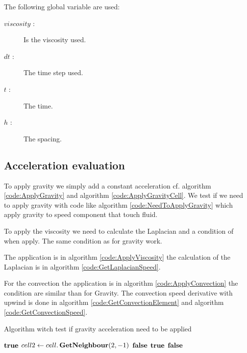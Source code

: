 The following global variable are used:
\begin{description}
 \item[$viscosity$ :] Is the viscosity used.
 \item[$dt$ :] The time step used.
 \item[$t$ :] The time.
 \item[$h$ :] The spacing.
\end{description}


\subsection{Acceleration evaluation}

To apply gravity we simply add a constant acceleration cf. algorithm \ref{code:ApplyGravity} and algorithm \ref{code:ApplyGravityCell}.
We test if we need to apply gravity with code like algorithm \ref{code:NeedToApplyGravity} which apply gravity to speed component
that touch fluid.

To apply the viscosity we need to calculate the Laplacian and a condition of when apply.
The same condition as for gravity work.

The application is in algorithm \ref{code:ApplyViscosity} the calculation of the Laplacian is in algorithm \ref{code:GetLaplacianSpeed}.

For the convection the application is in algorithm \ref{code:ApplyConvection} the condition are similar than for Gravity.
The convection speed derivative with upwind is done in algorithm \ref{code:GetConvectionElement} and algorithm \ref{code:GetConvectionSpeed}.

\begin{algorithm}
\caption{Algorithm witch test if gravity acceleration need to be applied}
\label{code:NeedToApplyGravity}
\begin{algorithmic}[1]
			\State \Return $\mathop{\textbf{true}}$ 
		\EndIf
		\State $cell2 \gets cell.\mathop{\textbf{GetNeighbour}}(2,-1)$ 
			\State \Return $\mathop{\textbf{false}}$ 
		\EndIf
			\State \Return $\mathop{\textbf{true}}$ 
		\EndIf
		\State \Return $\mathop{\textbf{false}}$
	\EndFunction
	\end{algorithmic}
\end{algorithm}

